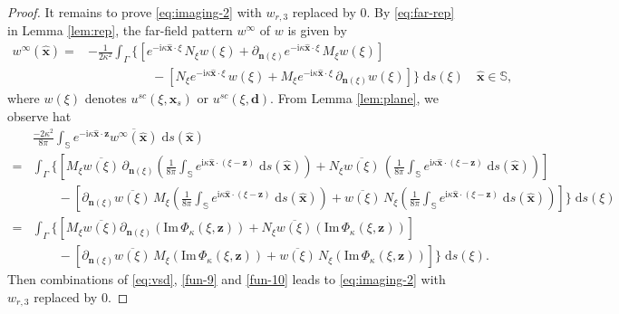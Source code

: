 \documentclass[10pt,a4paper]{article}
\numberwithin{equation}{section}
\begin{document}
\begin{proof}
    It remains to prove   \eqref{eq:imaging-2}  with $w_{r,3}$ replaced by $0$.
    By \eqref{eq:far-rep} in Lemma \ref{lem:rep}, the far-field pattern $w^{\infty}$ of  $w$ is given by
    \begin{align*}
        w^{\infty}(\hat{\bm x}) = & -\frac{1}{2\kappa^2}
                \int_{\Gamma}\Big\{
                  [  e^{-\mathrm{i}\kappa\hat{\bm x}\cdot \xi}\, N_{\xi} w(\xi)
                           + \partial_{\bm{n}(\xi)}e^{-\mathrm{i}\kappa\hat{\bm x}\cdot \xi} \, M_{\xi} w(\xi) ] \\
             & \qquad\qquad\quad   - [ N_{\xi}e^{-\mathrm{i}\kappa\hat{\bm x}\cdot \xi} \,   w(\xi)
                    + M_{\xi}e^{-\mathrm{i}\kappa\hat{\bm x}\cdot \xi}\,  \partial_{\bm{n}(\xi)} w(\xi) ]
                \Big\} \;\mathrm{d}s(\xi) \quad \hat{\bm x}\in \mathbb{S},
    \end{align*}
    where $w(\xi)$ denotes  $ u^{sc}(\xi,\bm{x}_s)$  or $u^{sc}(\xi,\bm{d})$. From Lemma \ref{lem:plane}, we observe hat
    \begin{align*}
      & \frac{-2 \kappa^2}{8\pi}\int_{ \mathbb{S}  }  e^{-\mathrm{i}\kappa\hat{\bm x}\cdot \bm{ z }} \overline{w^{\infty}(\hat{\bm{ x }})} \;\mathrm{d}s (\hat{\bm x}) \\
       =&  \int_{ \Gamma } \Big\{ [M_{\xi}\overline{w(\xi)}\,  \partial_{\bm{n}(\xi )}
        (\frac{1}{8 \pi}\int_{ \mathbb{S}  }e^{\mathrm{i}\kappa\hat{\bm x}\cdot (\xi-\bm{ z })}  \;\mathrm{d}s (\hat{\bm x}) )
        +N_{\xi } \overline{w(\xi)} \,
         (\frac{1}{8 \pi}\int_{ \mathbb{S}  }e^{\mathrm{i}\kappa\hat{\bm x}\cdot (\xi-\bm{ z })} \;\mathrm{d}s (\hat{\bm x}) ) ]  \\
   & \qquad - [ \partial_{\bm{n}(\xi )}\overline{w(\xi)} \, M_{\xi }
   (\frac{1}{8 \pi}\int_{ \mathbb{S}  }e^{\mathrm{i}\kappa\hat{\bm x}\cdot (\xi-\bm{ z })} \;\mathrm{d}s (\hat{\bm x})  )
     + \overline{w(\xi)}\,  N_{\xi }
   (\frac{1}{8 \pi}\int_{ \mathbb{S}  }e^{\mathrm{i}\kappa\hat{\bm x}\cdot (\xi-\bm{ z })} \;\mathrm{d}s (\hat{\bm x})  )
     ]  \Big\} \;\mathrm{d}s(\xi)  \\
      =&  \int_{ \Gamma } \Big\{ [M_{\xi}\overline{w(\xi)} \partial_{\bm{n}(\xi )}
        (\mathrm{Im}\, \Phi_{\kappa}(\xi,\bm{z}))
        + N_{\xi } \overline{w(\xi)}
         (\mathrm{Im}\, \Phi_{\kappa}(\xi,\bm{z})) ]  \\
   & \qquad - [ \partial_{\bm{n}(\xi )}\overline{w(\xi)}\, M_{\xi }
     ( \mathrm{Im}\, \Phi_{\kappa}(\xi,\bm{z})  )
     + \overline{w(\xi)}\,  N_{\xi }
     ( \mathrm{Im}\, \Phi_{\kappa}(\xi,\bm{z}) )
     ]  \Big\} \;\mathrm{d}s(\xi). 
    \end{align*}
    Then combinations of \eqref{eq:vsd}, \eqref{fun-9} and \eqref{fun-10} leads to  \eqref{eq:imaging-2}  with $w_{r,3}$ replaced by $0$.


\end{proof}
\end{document}
